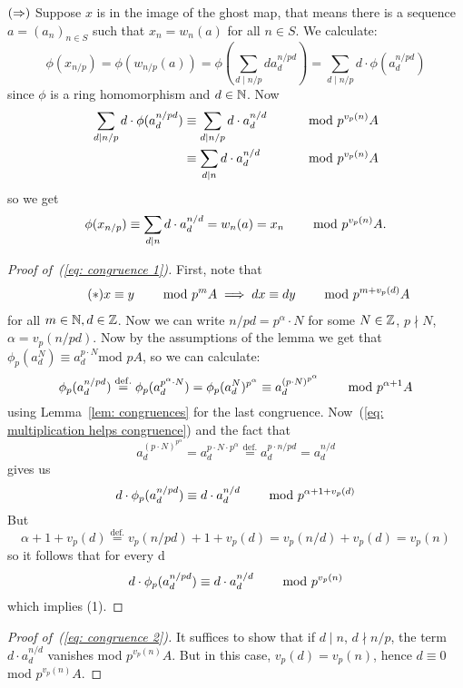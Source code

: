 \begin{bigproof}
    $(\Rightarrow)$ Suppose $x$ is in the image of the ghost map, that means there is a sequence 
    $a = (a_n)_{n \in S}$ such that $x_n = w_n(a)$ for all $n \in S$. 
    We calculate:
    \[
        \phi(x_{n/p}) = \phi(w_{n/p}(a)) = \phi(\sum_{d \mid n/p} d a_d^{n/pd}) =
        \sum_{d \mid n/p} d \cdot \phi(a_d^{n/pd}) 
    \] 
    since $\phi$ is a ring homomorphism and $d \in \mathbb{N}$.
    Now
    \begin{align}
        \label{eq: congruence 1}
        \sum_{d \mid n/p} d \cdot \phi(a_d^{n/pd}) 
        &\equiv
        \sum_{d \mid n/p} d \cdot a_d^{n/d} &\text{\hskip8mm mod} \ p^{v_p(n)}A \\
        \label{eq: congruence 2}
        &\equiv \sum_{d \mid n} d \cdot a_d^{n/d} &\text{\hskip8mm mod} \ p^{v_p(n)}A
    \end{align}
    so we get
    \[
        \phi(x_{n/p}) \equiv \sum_{d \mid n} d \cdot a_d^{n/d} = w_n(a) = x_n \text{\hskip8mm mod} \ p^{v_p(n)}A.
        \]
    \begin{proof}[Proof of~(\ref{eq: congruence 1})]
    First, note that 
\begin{align}\label{eq: multiplication helps congruence} \tag{$\ast$}
        x \equiv y \text{\hskip8mm mod }p^mA \implies dx \equiv dy \text{\hskip8mm mod } p^{m+v_p(d)}A
    \end{align}
    for all $m \in \mathbb{N}, d \in \mathbb{Z}$.
    Now we can write $n/pd = p^{\alpha} \cdot N$ for some $N \in \mathbb{Z}$,
    $p \nmid N$, $\alpha = v_p(n/pd)$. 
    Now by the assumptions of the lemma we get that $\phi_p(a_d^N)
    \equiv a_d^{p \cdot N} \text{mod }pA$, so we can calculate:
    \[
        \phi_p(a_d^{n/pd}) \overset{\mathrm{def.}}{=} \phi_p(a_d^{p^{\alpha} \cdot N})
        = \phi_p(a_d^N)^{p^{\alpha}} \equiv a_d^{(p\cdot N)^{p^{\alpha}}} \text{\hskip8mm mod } p^{\alpha +1}A
    \]
    using Lemma~\ref{lem: congruences} for the last congruence. 
    Now~(\ref{eq: multiplication helps congruence}) and the fact that
    \[
        a_d^{(p \cdot N)^{p^{\alpha}}} = a_d^{p \cdot N \cdot p^{\alpha}} 
        \overset{\mathrm{def.}}{=}
        a_d^{p \cdot n/pd} = a_d^{n/d} 
    \]
    gives us
    \[
        d \cdot \phi_p(a_d^{n/pd}) \equiv d \cdot a_d^{n/d} \text{\hskip8mm mod } p^{\alpha + 1 + v_p(d)}
    \]
    But 
    \[
        \alpha + 1 + v_p(d) \overset{\mathrm{def.}}{=} v_p(n/pd) + 1 + v_p(d)
        = v_p(n/d) + v_p(d) = v_p(n)
    \]
    so it follows that for every d 
    \[
        d \cdot \phi_p(a_d^{n/pd}) \equiv d \cdot a_d^{n/d} \text{\hskip8mm mod } p^{v_p(n)}
    \] 
    which implies (1).
    \end{proof}
    \begin{proof}[Proof of~(\ref{eq: congruence 2})]
        It suffices to show that if $d \mid n$, $d \nmid n/p$, the term 
        $d \cdot a_d^{n/d}$ vanishes mod $p^{v_p(n)}A$.
        But in this case, $v_p(d) = v_p(n)$, hence $d \equiv 0$ mod  $p^{v_p(n)}A$.
    \end{proof} 
    

\end{bigproof}
